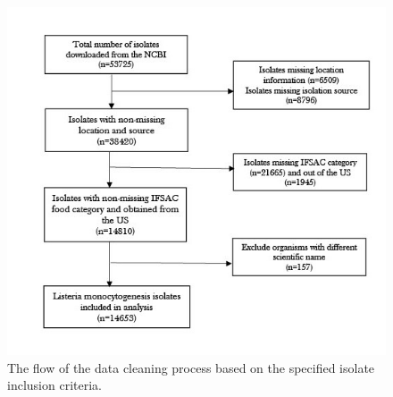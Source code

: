 \documentclass[
  10pt,
]{article}
\begin{document}
\begin{figure}[H]

{\centering \includegraphics[width=0.86\linewidth]{../figures/data_cleaning} 

}

\caption{The flow of the data cleaning process based on the specified isolate inclusion criteria.}\label{fig:fig-one}
\end{figure}
\end{document}
